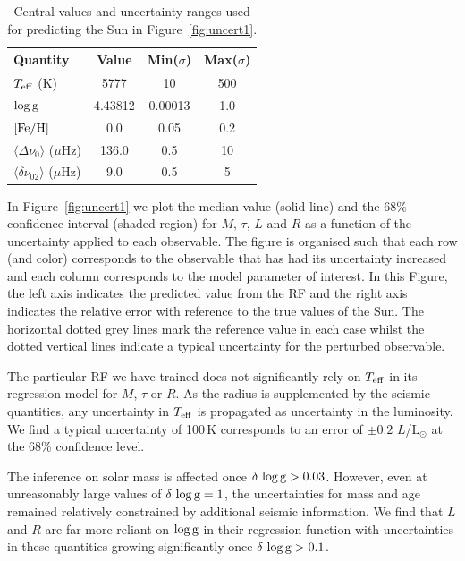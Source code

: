  
 \begin{table}
 \centering
    \caption{Central values and uncertainty ranges used for predicting the Sun in Figure~\ref{fig:uncert1}.}
    \begin{tabular}{lccc}
    \hline \hline
Quantity & Value & Min($\sigma$) & Max($\sigma$) \\ \hline 
$T_{\rm{eff}}$ (K)  & 5777 & 10  & 500\\
$\log \rm{g}$ &  4.43812 & 0.00013 & 1.0\\
$[\rm{Fe/H}]$ & 0.0 & 0.05 & 0.2 \\
$\langle\Delta\nu_0\rangle$ ($\mu$Hz) & 136.0 & 0.5 & 10\\
$\langle\delta\nu_{02}\rangle$ ($\mu$Hz)& 9.0 & 0.5 & 5 \\
\hline
    \end{tabular}
    \label{tab:sun}
\end{table}

 
In Figure~\ref{fig:uncert1} we plot the median value (solid line) and the 68\%  confidence interval (shaded region)
 for $M$, $\tau$, $L$ and $R$ as a function of the uncertainty applied to each observable. The figure is organised such that each row (and color) corresponds to the observable that has had its uncertainty increased and each column corresponds to the model parameter of interest. In this Figure, the left axis indicates the predicted value from the RF and the right axis indicates the relative error with reference to the true values of the Sun.  The horizontal dotted grey lines mark the reference value in each case whilst the dotted vertical lines indicate a typical uncertainty for the perturbed observable. 

The particular RF we have trained does not significantly rely on $T_{\rm{eff}}$ in its regression model for $M$, $\tau$ or $R$. As the radius is supplemented by the seismic quantities, any uncertainty in $T_{\rm{eff}}$ is propagated as uncertainty in the luminosity. We find a typical uncertainty of 100\,K corresponds to an error of $\pm 0.2$ $L$/L$_{\odot}$ at the 68\% confidence level.

The inference on solar mass is affected once $\delta \, \log \rm{g} > 0.03$. 
However, even at unreasonably large values of  $\delta \, \log \rm{g} = 1$, the uncertainties for mass and age remained relatively constrained by additional seismic information. We find 
that $L$ and $R$ are far more reliant on $\log \rm{g}$ in their regression function with uncertainties in these quantities growing significantly once  $\delta \, \log \rm{g} > 0.1$.

